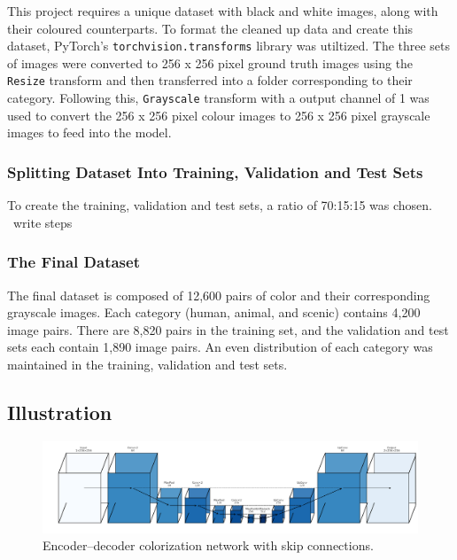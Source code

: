 \documentclass{article} %
\begin{document}
This project requires a unique dataset with black and white images, along with their coloured counterparts. To format the cleaned up data and create this dataset, PyTorch’s \verb|torchvision.transforms| library was utiltized. The three sets of images were converted to 256 x 256 pixel ground truth images using the \verb|Resize| transform and then transferred into a folder corresponding to their category. Following this, \verb|Grayscale|
 transform with a output channel of 1 was used to convert the 256 x 256 pixel colour images to 256 x 256 pixel grayscale images to feed into the model. 

 \subsubsection{Splitting Dataset Into Training, Validation and Test Sets}

To create the training, validation and test sets, a ratio of 70:15:15 was chosen. ~write steps 

\subsubsection{The Final Dataset}

The final dataset is composed of 12,600 pairs of color and their corresponding grayscale images. Each category (human, animal, and scenic) contains 4,200 image pairs. There are 8,820 pairs in the training set, and the validation and test sets each contain 1,890 image pairs. An even distribution of each category was maintained in the training, validation and test sets. 

\subsection{Illustration}

\begin{figure}[htbp]            %
  \centering
  \includegraphics[width=0.9\linewidth]{Figs/architecture.png}
  \caption{Encoder–decoder colorization network with skip connections.}
  \label{fig:architecture}
\end{figure}
\end{document}
